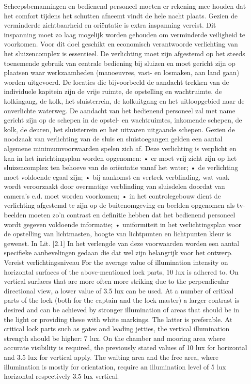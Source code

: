 Scheepsbemanningen en bedienend personeel moeten er rekening mee houden dat het comfort tijdens het schutten afneemt
vindt de hele nacht plaats. Gezien de verminderde zichtbaarheid en oriëntatie is extra inspanning vereist. Dit
inspanning moet zo laag mogelijk worden gehouden om verminderde veiligheid te voorkomen. Voor dit doel geschikt
en economisch verantwoorde verlichting van het sluizencomplex is essentieel.
De verlichting moet zijn afgestemd op het steeds toenemende gebruik van centrale bediening bij sluizen en moet gericht zijn
op plaatsen waar werkzaamheden (manoeuvres, vast- en losmaken, aan land gaan) worden uitgevoerd.
De locaties die bijvoorbeeld de aandacht trekken van de individuele kapitein zijn de vrije ruimte, de opstelling
en wachtruimte, de kolkingang, de kolk, het sluisterrein, de kolkuitgang en het uitloopgebied
naar de onverlichte waterweg. De aandacht van het bedienend personeel zal met name gericht zijn op de schepen in de
opstel- en wachtruimtes, inkomende schepen, de kolk, de deuren, het sluisterrein en het uitvaren
uitgaande schepen.
Gezien de noodzaak van verlichting van de sluis en sluistoegangen gelden een aantal algemene minimumvoorwaarden
spelen zich af. Deze verlichting is verplicht en kan in het inrichtingsplan worden opgenomen:
• er moet vrij zicht zijn op het sluizencomplex ten behoeve van de oriëntatie vanaf het water;
• de verlichting moet voldoende egaal zijn;
• bij aankomst en vertrek verblinding, wat vaak wordt veroorzaakt door overmatige verblinding van sluisdelen doordat
van camera's e.d. moet worden voorkomen;
• in het controlegebouw dient de verlichting afgestemd te zijn op de buitenomgeving en beelden
opgenomen als tv-beelden moeten zo'n contrast en definitie hebben dat het bedienend personeel wordt gegeven
voldoende informatie;
• uniformiteit in het verlichtingsplan voor de opstelling van lichtmasten, hoogte van lichtpunten en lichtpunten
kleur is gewenst.
In Lit. [2.1] In het verlengde van deze voorwaarden worden een aantal specifieke aanbevelingen gedaan die dat wel zijn
belangrijk voor het ontwerp.
Vereist verlichtingsniveau
For the average value of illumination intensity on horizontal surfaces of the above-mentioned lock
parts, 10 lux is adhered to. On vertical surfaces that are more often more striking due to the perpendicular
directional view, a lower value of 3.5 lux can be used.
At a number of critical parts of the lock (both for the captain and the lock master) a larger contrast is
desired and can be achieved by stronger illumination of areas that should be in the light or providing
these with white markings. The latter is preferable. At critical lock parts such as gates and leading
jetties, the vertical illumination strength should be higher: 7 lux. On the chamber and mooring area
where accurate visibility is required, the previously stated values of 10 lux for horizontal and 3.5 lux
for vertical apply. The waiting area and the free area, where illumination is mostly for orientation,
require an illumination level of 5 lux horizontal respectively 3.5 lux vertical.

